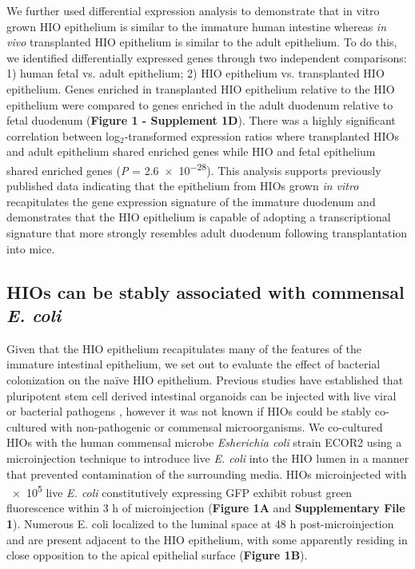 \documentclass[9pt,lineo]{elife}
\begin{document}
We further used differential expression analysis to demonstrate that in vitro grown HIO epithelium is similar to the immature human intestine whereas \emph{in vivo} transplanted HIO epithelium is similar to the adult epithelium.  To do this, we identified differentially expressed genes through two independent comparisons: 1) human fetal vs. adult epithelium; 2) HIO epithelium vs. transplanted HIO epithelium. Genes enriched in transplanted HIO epithelium relative to the HIO epithelium were compared to genes enriched in the adult duodenum relative to fetal duodenum (\textbf{Figure 1 - Supplement 1D}). There was a highly significant correlation between log\(_{\text{2}}\)-transformed expression ratios where transplanted HIOs and adult epithelium shared enriched genes while HIO and fetal epithelium shared enriched genes  (\emph{P} = \num{2.6e-28}). This analysis supports previously published data indicating that the epithelium from HIOs grown \emph{in vitro} recapitulates the gene expression signature of the immature duodenum and demonstrates that the HIO epithelium is capable of adopting a transcriptional signature that more strongly resembles adult duodenum following transplantation into mice.

\subsection*{{\bfseries\sffamily } HIOs can be stably associated with commensal \emph{E. coli}}
\label{sec:orgheadline3}
Given that the HIO epithelium recapitulates many of the features of the immature intestinal epithelium, we set out to evaluate the effect of bacterial colonization on the na{\"i}ve HIO epithelium. Previous studies have established that pluripotent stem cell derived intestinal organoids can be injected with live viral \citep{Finkbeiner:2012} or bacterial pathogens \citep{Leslie:2015,Engevik:2015,Forbester:2015}, however it was not known if HIOs could be stably co-cultured with non-pathogenic or commensal microorganisms. We co-cultured HIOs with the human commensal microbe \emph{Esherichia coli} strain ECOR2 \citep{Ochman:1984} using a microinjection technique to introduce live \emph{E. coli} into the HIO lumen in a manner that prevented contamination of the surrounding media. HIOs microinjected with \num{e5} live \emph{E. coli} constitutively expressing GFP exhibit robust green fluorescence within 3 h of microinjection (\textbf{Figure 1A} and \textbf{Supplementary File 1}). Numerous E. coli localized to the luminal space at 48 h post-microinjection and are present adjacent to the HIO epithelium, with some apparently residing in close opposition to the apical epithelial surface (\textbf{Figure 1B}).
\end{document}
